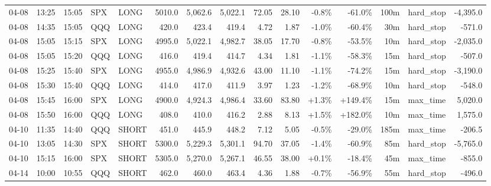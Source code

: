 \documentclass[11pt,a4paper,twoside]{article}
\begin{document}
\begin{landscape}
\begin{center}
\begin{longtable}{>{\color{txtmain}}l l l l l r r r r r r r r >{\color{txtmain}}l r}
04-08 & 13:25 & 15:05 & SPX & LONG & 5010.0 & 5,062.6 & 5,022.1 & 72.05 & 28.10 & \textcolor{lossred}{-0.8\%} & \textcolor{lossred}{-61.0\%} & 100m & hard\_stop & \textcolor{lossred}{-4,395.0} \\
04-08 & 14:35 & 15:05 & QQQ & LONG & 420.0 & 423.4 & 419.4 & 4.72 & 1.87 & \textcolor{lossred}{-1.0\%} & \textcolor{lossred}{-60.4\%} & 30m & hard\_stop & \textcolor{lossred}{-571.0} \\
04-08 & 15:05 & 15:15 & SPX & LONG & 4995.0 & 5,022.1 & 4,982.7 & 38.05 & 17.70 & \textcolor{lossred}{-0.8\%} & \textcolor{lossred}{-53.5\%} & 10m & hard\_stop & \textcolor{lossred}{-2,035.0} \\
04-08 & 15:05 & 15:20 & QQQ & LONG & 416.0 & 419.4 & 414.7 & 4.34 & 1.81 & \textcolor{lossred}{-1.1\%} & \textcolor{lossred}{-58.3\%} & 15m & hard\_stop & \textcolor{lossred}{-507.0} \\
04-08 & 15:25 & 15:40 & SPX & LONG & 4955.0 & 4,986.9 & 4,932.6 & 43.00 & 11.10 & \textcolor{lossred}{-1.1\%} & \textcolor{lossred}{-74.2\%} & 15m & hard\_stop & \textcolor{lossred}{-3,190.0} \\
04-08 & 15:30 & 15:40 & QQQ & LONG & 414.0 & 417.0 & 411.9 & 3.97 & 1.23 & \textcolor{lossred}{-1.2\%} & \textcolor{lossred}{-68.9\%} & 10m & hard\_stop & \textcolor{lossred}{-548.0} \\
04-08 & 15:45 & 16:00 & SPX & LONG & 4900.0 & 4,924.3 & 4,986.4 & 33.60 & 83.80 & \textcolor{wingreen}{+1.3\%} & \textcolor{wingreen}{+149.4\%} & 15m & max\_time & \textcolor{wingreen}{5,020.0} \\
04-08 & 15:50 & 16:00 & QQQ & LONG & 408.0 & 410.0 & 416.2 & 2.88 & 8.13 & \textcolor{wingreen}{+1.5\%} & \textcolor{wingreen}{+182.0\%} & 10m & max\_time & \textcolor{wingreen}{1,575.0} \\
04-10 & 11:35 & 14:40 & QQQ & SHORT & 451.0 & 445.9 & 448.2 & 7.12 & 5.05 & \textcolor{lossred}{-0.5\%} & \textcolor{lossred}{-29.0\%} & 185m & max\_time & \textcolor{lossred}{-206.5} \\
04-10 & 13:05 & 14:30 & SPX & SHORT & 5300.0 & 5,229.3 & 5,301.1 & 94.70 & 37.05 & \textcolor{lossred}{-1.4\%} & \textcolor{lossred}{-60.9\%} & 85m & hard\_stop & \textcolor{lossred}{-5,765.0} \\
04-10 & 15:15 & 16:00 & SPX & SHORT & 5305.0 & 5,270.0 & 5,267.1 & 46.55 & 38.00 & \textcolor{wingreen}{+0.1\%} & \textcolor{lossred}{-18.4\%} & 45m & max\_time & \textcolor{lossred}{-855.0} \\
04-14 & 10:00 & 10:55 & QQQ & SHORT & 462.0 & 460.0 & 463.4 & 4.36 & 1.88 & \textcolor{lossred}{-0.7\%} & \textcolor{lossred}{-56.9\%} & 55m & hard\_stop & \textcolor{lossred}{-496.0} \\

\end{longtable}
\end{center}
\end{landscape}
\end{document}
